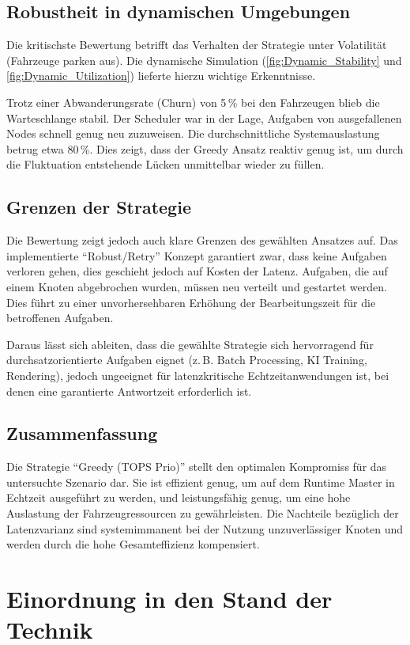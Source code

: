 \subsection{Robustheit in dynamischen Umgebungen}
Die kritischste Bewertung betrifft das Verhalten der Strategie unter Volatilität (Fahrzeuge parken aus). Die dynamische Simulation (\autoref{fig:Dynamic_Stability} und \autoref{fig:Dynamic_Utilization}) lieferte hierzu wichtige Erkenntnisse. 

Trotz einer Abwanderungsrate (Churn) von 5\,\% bei den Fahrzeugen blieb die Warteschlange stabil. Der Scheduler war in der Lage, Aufgaben von ausgefallenen Nodes schnell genug neu zuzuweisen. Die durchschnittliche Systemauslastung betrug etwa 80\,\%. Dies zeigt, dass der Greedy Ansatz reaktiv genug ist, um durch die Fluktuation entstehende Lücken unmittelbar wieder zu füllen.

\subsection{Grenzen der Strategie}
Die Bewertung zeigt jedoch auch klare Grenzen des gewählten Ansatzes auf. Das implementierte \enquote{Robust/Retry} Konzept garantiert zwar, dass keine Aufgaben verloren gehen, dies geschieht jedoch auf Kosten der Latenz. Aufgaben, die auf einem Knoten abgebrochen wurden, müssen neu verteilt und gestartet werden. Dies führt zu einer unvorhersehbaren Erhöhung der Bearbeitungszeit für die betroffenen Aufgaben. 

Daraus lässt sich ableiten, dass die gewählte Strategie sich hervorragend für durchsatzorientierte Aufgaben eignet (z.\,B. Batch Processing, KI Training, Rendering), jedoch ungeeignet für latenzkritische Echtzeitanwendungen ist, bei denen eine garantierte Antwortzeit erforderlich ist.

\subsection{Zusammenfassung}
Die Strategie \enquote{Greedy (TOPS Prio)} stellt den optimalen Kompromiss für das untersuchte Szenario dar. Sie ist effizient genug, um auf dem Runtime Master in Echtzeit ausgeführt zu werden, und leistungsfähig genug, um eine hohe Auslastung der Fahrzeugressourcen zu gewährleisten. Die Nachteile bezüglich der Latenzvarianz sind systemimmanent bei der Nutzung unzuverlässiger Knoten und werden durch die hohe Gesamteffizienz kompensiert.

\section{Einordnung in den Stand der Technik}
\label{sec:StandDerTechnikDiskussion}

